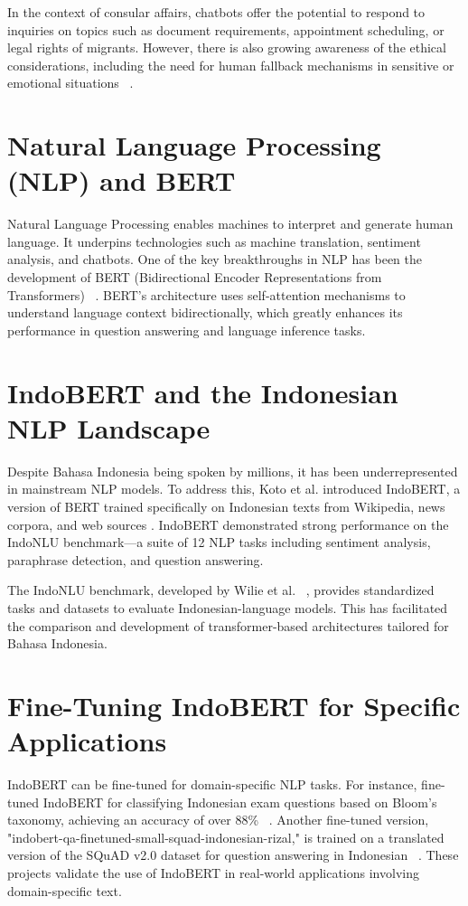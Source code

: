 \documentclass[a4paper,12pt]{report}
\begin{document}
In the context of consular affairs, chatbots offer the potential to respond to inquiries on topics such as document requirements, appointment scheduling, or legal rights of migrants. However, there is also growing awareness of the ethical considerations, including the need for human fallback mechanisms in sensitive or emotional situations ~\cite{atallah2023}.

\section{Natural Language Processing (NLP) and BERT}
Natural Language Processing enables machines to interpret and generate human language. It underpins technologies such as machine translation, sentiment analysis, and chatbots. One of the key breakthroughs in NLP has been the development of BERT (Bidirectional Encoder Representations from Transformers) ~\cite{devlin2019bert}. BERT's architecture uses self-attention mechanisms to understand language context bidirectionally, which greatly enhances its performance in question answering and language inference tasks.

\section{IndoBERT and the Indonesian NLP Landscape}
Despite Bahasa Indonesia being spoken by millions, it has been underrepresented in mainstream NLP models. To address this, Koto et al. introduced IndoBERT, a version of BERT trained specifically on Indonesian texts from Wikipedia, news corpora, and web sources \cite{koto2020}. IndoBERT demonstrated strong performance on the IndoNLU benchmark—a suite of 12 NLP tasks including sentiment analysis, paraphrase detection, and question answering.

The IndoNLU benchmark, developed by Wilie et al. ~\cite{wilie2020}, provides standardized tasks and datasets to evaluate Indonesian-language models. This has facilitated the comparison and development of transformer-based architectures tailored for Bahasa Indonesia.

\section{Fine-Tuning IndoBERT for Specific Applications}
IndoBERT can be fine-tuned for domain-specific NLP tasks. For instance, fine-tuned IndoBERT for classifying Indonesian exam questions based on Bloom’s taxonomy, achieving an accuracy of over 88\% ~\cite{naufal2023}. Another fine-tuned version, "indobert-qa-finetuned-small-squad-indonesian-rizal," is trained on a translated version of the SQuAD v2.0 dataset for question answering in Indonesian ~\cite{rizal2023}. These projects validate the use of IndoBERT in real-world applications involving domain-specific text.
\end{document}

